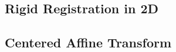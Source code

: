 \subsection{Rigid Registration in 2D}
\label{sec:RigidRegistrationIn2D}
\ifitkFullVersion

\fi











\subsection{Centered Affine Transform}
\label{sec:CenteredAffineTransform}
\ifitkFullVersion

\fi





